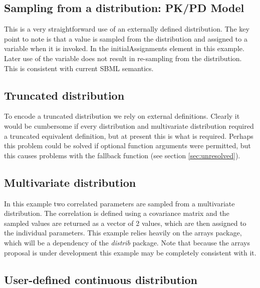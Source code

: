 \documentclass[draftspec]{sbmlpkgspec}
\newcommand{\arraysshort}{arrays\xspace}
\newcommand{\distribshort}{\emph{distrib}\xspace}
\newcommand{\controversial}{\marginpar{\hspace*{34pt}\raisebox{-0.5ex}{\Large?}}}
\begin{document}
\subsection{Sampling from a distribution: PK/PD Model}

This is a very straightforward use of an externally defined
distribution. The key point to note is that a value is sampled from
the distribution and assigned to a variable when it is invoked. In the
initialAssignments element in this example. Later use of the variable
does not result in re-sampling from the distribution. This is
consistent with current SBML semantics.


\subsection{Truncated distribution}
\label{sec: truncated-eg}

To encode a truncated distribution we rely on external
definitions. Clearly it would be cumbersome if every distribution and
multivariate distribution required a truncated equivalent definition,
but at present this is what is required\controversial. Perhaps this
problem could be solved if optional function arguments were permitted,
but this causes problems with the fallback function (see section \ref{sec:unresolved}).


\subsection{Multivariate distribution}

In this example two correlated parameters are sampled from a
multivariate distribution. The correlation is defined using a
covariance matrix and the sampled values are returned as a vector of 2
values, which are then assigned to the individual parameters. This
example relies heavily on the \arraysshort package, which will be a
dependency of the \distribshort package. Note that because the
\arraysshort proposal is under development this example may be
completely consistent with it.


\subsection{User-defined continuous distribution }
\end{document}
